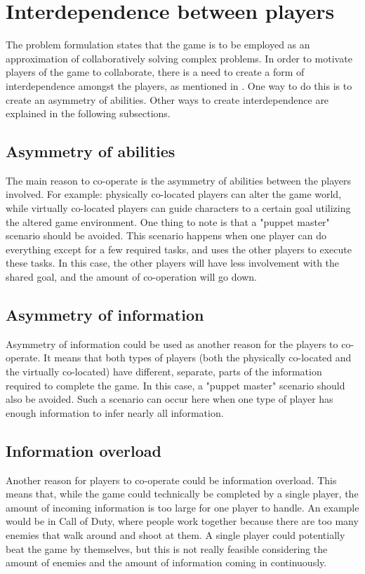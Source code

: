 	\section{Interdependence between players} \label{sec:interdependence}
		The problem formulation states that the game is to be employed as an
		approximation of collaboratively solving complex problems. In order to
		motivate players of the game to collaborate, there is a need to create
		a form of interdependence amongst the players, as mentioned in
		\cite{zagal}. One way to do this is to create an asymmetry of abilities.
		Other ways to create interdependence are explained in the following
		subsections.
		\subsection{Asymmetry of abilities}
			The main reason to co-operate is the asymmetry of abilities between
			the players involved. For example: physically co-located players can
			alter the game world, while virtually co-located players can guide
			characters to a certain goal utilizing the altered game environment.
			One thing to note is that a "puppet master" scenario should be
			avoided. This scenario happens when one player can do everything
			except for a few required tasks, and uses the other players to
			execute these tasks. In this case, the other players will have less
			involvement with the shared goal, and the amount of co-operation
			will go down.
		\subsection{Asymmetry of information}
			Asymmetry of information could be used as another reason for the
			players to co-operate. It means that both types of players (both the
			physically co-located and the virtually co-located) have different,
			separate, parts of the information required to complete the game. In
			this case, a "puppet master" scenario should also be avoided. Such a
			scenario can occur here when one type of player has enough
			information to infer nearly all information.

		\subsection{Information overload}
			Another reason for players to co-operate could be information
			overload. This means that, while the game could technically be
			completed by a single player, the amount of incoming information is
			too large for one player to handle. An example would be in Call of
			Duty, where people work together because there are too many enemies
			that walk around and shoot at them. A single player could
			potentially beat the game by themselves, but this is not really
			feasible considering the amount of enemies and the amount of
			information coming in continuously.

	
